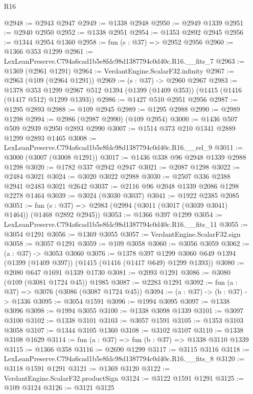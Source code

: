 \begin{lexlean}{R16}
\begin{coremodule}
@2948 := @2943 @2947
@2949 := @1338 @2948
@2950 := @2949 @1339
@2951 := @2940 @2950
@2952 := @1338 @2951
@2954 := @1353 @2892 @2945
@2956 := @1344 @2954 @1360
@2958 := fun (s : @37) => @2952 @2956
@2960 := @1366 @353 @1299
@2961 := LexLeanPreserve.C794a6cad1b5e8fdc98d1387794c0d40c.R16.__fits_7
@2963 := @1369 (@2961 @1291)
@2964 := VerdantEngine.ScalarF32.infinity
@2967 := @2963 (@109 (@2964 @1291))
@2969 := (s : @37) -> @2960 @2967
@2983 := @1378
    @353
    @1299
    @2967
    @512
    @1394
    (@1399 (@1409 @353))
    (@1415 (@1416 (@1417 @512) @1299 @1393))
@2986 := @1427 @510 @2951 @2956
@2987 := @1295 @2893
@2988 := @109 @2945
@2989 := @1295 @2988
@2990 := @2989 @1298
@2994 := @2986 (@2987 @2990) (@109 @2954)
@3000 := @1436 @507 @509 @2939 @2950 @2893 @2990
@3007 := @1514 @373 @210 @1341 @2889 @1299 @2893 @1465
@3008 := LexLeanPreserve.C794a6cad1b5e8fdc98d1387794c0d40c.R16.__rel_9
@3011 := @3000 (@3007 (@3008 @1291))
@3017 := @1436 @338 @96 @2948 @1339 @2988 @1298
@3020 := @1782 @337 @2942 @2947
@3021 := @2087 @1298
@3022 := @2484 @3021
@3024 := @3020 @3022 @2988
@3030 := @2507 @336 @2388 @2941 @2483 @3021 @2642
@3037 := @2116 @96 @2048 @1339 @2086 @1298 @2278 @1464
@3039 := @3024 (@3030 @3037)
@3041 := @1922 @2385 @2085
@3051 := fun (s : @37) => @2983 (@2994 (@3011 (@3017 (@3039 @3041) @1464)) (@1468 @2892 @2945))
@3053 := @1366 @397 @1299
@3054 := LexLeanPreserve.C794a6cad1b5e8fdc98d1387794c0d40c.R16.__fits_11
@3055 := @3054 @1291
@3056 := @1369 @3055
@3057 := VerdantEngine.ScalarF32.sign
@3058 := @3057 @1291
@3059 := @109 @3058
@3060 := @3056 @3059
@3062 := (a : @37) -> @3053 @3060
@3076 := @1378
    @397
    @1299
    @3060
    @649
    @1394
    (@1399 (@1409 @397))
    (@1415 (@1416 (@1417 @649) @1299 @1393))
@3080 := @2080 @647 @1691 @1339 @1730
@3081 := @2093 @1291
@3086 := @3080 (@109 (@3081 @1724 @45)) @1985
@3087 := @2283 @1291
@3092 := fun (a : @37) => @3076 (@3086 (@3087 @1724 @45))
@3094 := (a : @37) -> (b : @37) -> @1336
@3095 := @3054 @1591
@3096 := @1994 @3095
@3097 := @1338 @3096
@3098 := @1994 @3055
@3100 := @1338 @3098 @1339
@3101 := @3097 @3100
@3102 := @1338 @3101
@3103 := @3057 @1591
@3105 := @1353 @3103 @3058
@3107 := @1344 @3105 @1360
@3108 := @3102 @3107
@3110 := @1338 @3108 @1629
@3114 := fun (a : @37) => fun (b : @37) => @1338 @3110 @1339
@3115 := @1366 @358
@3116 := @2690 @1299
@3117 := @3115 @3116
@3118 := LexLeanPreserve.C794a6cad1b5e8fdc98d1387794c0d40c.R16.__fits_8
@3120 := @3118 @1591 @1291
@3121 := @1369 @3120
@3122 := VerdantEngine.ScalarF32.productSign
@3124 := @3122 @1591 @1291
@3125 := @109 @3124
@3126 := @3121 @3125

\end{coremodule}
\end{lexlean}
